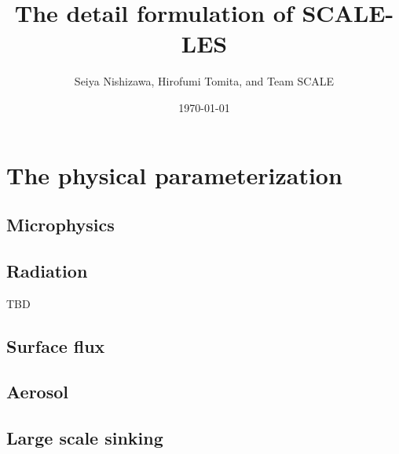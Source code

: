 \documentclass[a4paper]{report}
\title{{\LARGE The detail formulation of SCALE-LES}}
\author{Seiya Nishizawa, Hirofumi Tomita, and Team SCALE}
\date{\today}
\begin{document}
\maketitle
\tableofcontents
















\chapter{The physical parameterization}



\section{Microphysics}


\section{Radiation}
{\Huge TBD}

\section{Surface flux}


\section{Aerosol}


\section{Large scale sinking}





\appendix






\end{document}
